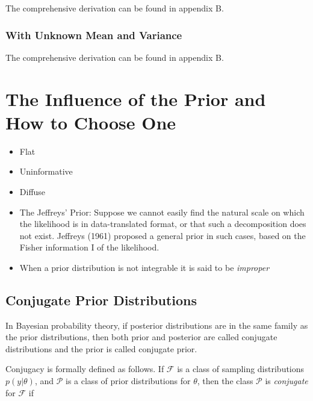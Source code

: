 The comprehensive derivation can be found in appendix B. 

\subsubsection{With Unknown Mean and Variance}

The comprehensive derivation can be found in appendix B. 




\section{The Influence of the Prior and How to Choose One}\label{sec:prior}

\begin{itemize}
    \item Flat
    \item Uninformative
    \item Diffuse
    \item The Jeffreys’ Prior: Suppose we cannot easily find the natural scale on which the likelihood is in data-translated format, or that such a decomposition does not exist. Jeffreys (1961) proposed a general prior in such cases, based on the Fisher information I of the likelihood. 
    \item When a prior distribution is not integrable it is said to be \textit{improper}
\end{itemize}


\subsection{Conjugate Prior Distributions}

In Bayesian probability theory, if posterior
distributions are in the same family as the prior
distributions, then both prior and posterior are called
conjugate distributions and the prior is called
conjugate prior.

Conjugacy is formally defined as follows. If $\mathcal{F}$ is a class of sampling distributions $p \left(y | \theta \right)$, and $\mathcal{P}$ is a class of prior distributions for $\theta$, then the class $\mathcal{P}$ is \textit{conjugate} for $\mathcal{F}$ if

